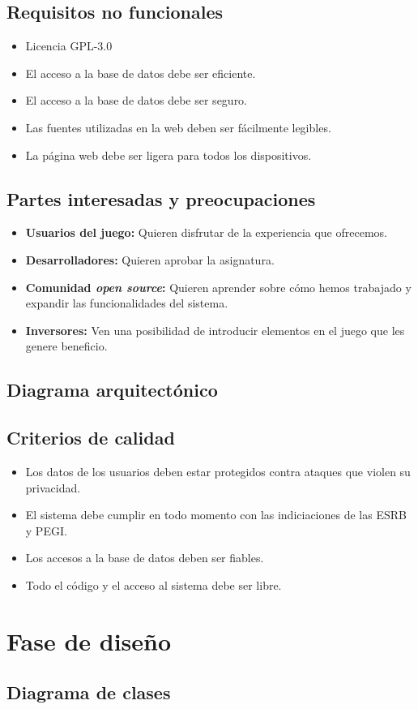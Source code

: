 \subsection{Requisitos no funcionales}

\begin{itemize}
	\item
		Licencia GPL-3.0
	\item
		El acceso a la base de datos debe ser eficiente.
	\item
		El acceso a la base de datos debe ser seguro.
	\item
		Las fuentes utilizadas en la web deben ser fácilmente legibles.
	\item
		La página web debe ser ligera para todos los dispositivos.
\end{itemize}

\subsection{Partes interesadas y preocupaciones}

\begin{itemize}
	\item
		\textbf{Usuarios del juego:}
		Quieren disfrutar de la experiencia que ofrecemos.
	\item
		\textbf{Desarrolladores:}
		Quieren aprobar la asignatura.
	\item
		\textbf{Comunidad \textit{open source}:}
		Quieren aprender sobre cómo hemos trabajado y expandir las funcionalidades del sistema.
	\item
		\textbf{Inversores:}
		Ven una posibilidad de introducir elementos en el juego que les genere beneficio.
\end{itemize}

\subsection{Diagrama arquitectónico}

\subsection{Criterios de calidad}

\begin{itemize}
	\item
		Los datos de los usuarios deben estar protegidos contra ataques que violen su privacidad.
	\item
		El sistema debe cumplir en todo momento con las indiciaciones de las ESRB y PEGI\@.
	\item
		Los accesos a la base de datos deben ser fiables.
	\item
		Todo el código y el acceso al sistema debe ser libre.
\end{itemize}

\section{Fase de diseño}

\subsection{Diagrama de clases}
